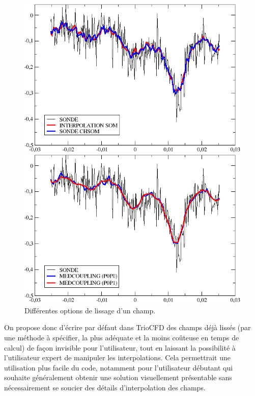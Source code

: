 \begin{figure}[!ht]
\begin{minipage}{0.5\linewidth}
\centering\includegraphics[width=\linewidth]{Figs/comparaison_sondes.png}
\end{minipage}
\begin{minipage}{0.5\linewidth}
\centering\includegraphics[width=\linewidth]{Figs/comparaison_medcoupling.png}
\end{minipage}
\caption{Diff\'erentes options de lissage d'un champ.}
\label{Fig=Interpolation}
\end{figure}

On propose donc d'\'ecrire par d\'efaut dans TrioCFD des champs d\'ej\`a liss\'es (par une m\'ethode \`a sp\'ecifier, la plus ad\'equate et la moins co\^uteuse en temps de
calcul) de fa\c con invisible pour l'utilisateur, tout en laissant la possibilit\'e \`a l'utilisateur expert de manipuler les interpolations. Cela permettrait une utilisation plus facile du code, notamment pour l'utilisateur d\'ebutant qui souhaite g\'en\'eralement obtenir une solution visuellement pr\'esentable sans n\'ecessairement se soucier des d\'etails d'interpolation des champs.

